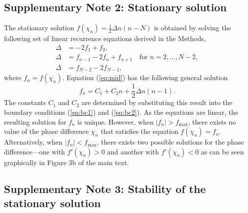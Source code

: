 \begin{appendices}
\clearpage
\subsection{Supplementary Note 2: Stationary solution}

The stationary solution $f(\chi_n)=\tfrac{1}{2}\Delta n(n-N)$ is obtained by solving the following set of linear recurrence equations derived in the Methods,
\begin{align}
    \Delta &= -2 f_1 + f_2 , \label{eq:bc1}
    \\
    \Delta &= f_{n-1} - 2 f_n + f_{n+1} \quad \text{for } n=2,\dots,N-2, \label{eq:mid}
    \\
    \Delta &= f_{N-2} - 2 f_{N-1}, \label{eq:bc2}
\end{align}
where $f_n=f(\chi_n)$.  Equation (\ref{eq:mid}) has the following general solution
\begin{equation}
    f_n = C_1 + C_2 n + \frac{1}{2}\Delta n(n-1).
\end{equation}
The constants $C_1$ and $C_2$ are determined by substituting this result into the boundary conditions (\ref{eq:bc1}) and (\ref{eq:bc2}).  As the equations are linear, the resulting solution for $f_n$ is unique. However, when $|f_n| > f_{\max}$, there exists no value of the phase difference $\chi_n$ that satisfies the equation $f(\chi_n)=f_n$.  Alternatively, when $|f_n|<f_{\max}$, there exists two possible solutions for the phase difference---one with $f'(\chi_n)>0$ and another with $f'(\chi_n)<0$ as can be seen graphically in Figure 3b of the main text.

\subsection{Supplementary Note 3: Stability of the stationary solution}


\end{appendices}
